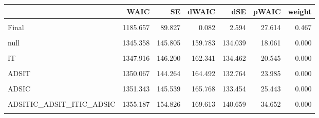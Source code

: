 \documentclass[10pt,dvipsnames,enabledeprecatedfontcommands]{scrartcl}
\begin{document}
\begin{table}
\centering\begingroup\fontsize{9}{11}\selectfont

\begin{tabular}{lrrrrrr}
\toprule
  & WAIC & SE & dWAIC & dSE & pWAIC & weight\\
\midrule
\cellcolor{gray!6}{tooFar} & \cellcolor{gray!6}{1185.575} & \cellcolor{gray!6}{89.393} & \cellcolor{gray!6}{0.000} & \cellcolor{gray!6}{NA} & \cellcolor{gray!6}{27.846} & \cellcolor{gray!6}{0.487}\\
Final & 1185.657 & 89.827 & 0.082 & 2.594 & 27.614 & 0.467\\
\cellcolor{gray!6}{ADSITICCBS\_ITIC\_ADSIC} & \cellcolor{gray!6}{1190.304} & \cellcolor{gray!6}{87.920} & \cellcolor{gray!6}{4.729} & \cellcolor{gray!6}{6.055} & \cellcolor{gray!6}{25.882} & \cellcolor{gray!6}{0.046}\\
null & 1345.358 & 145.805 & 159.783 & 134.039 & 18.061 & 0.000\\
\cellcolor{gray!6}{ADS} & \cellcolor{gray!6}{1347.281} & \cellcolor{gray!6}{142.655} & \cellcolor{gray!6}{161.706} & \cellcolor{gray!6}{131.261} & \cellcolor{gray!6}{21.935} & \cellcolor{gray!6}{0.000}\\
\addlinespace
IT & 1347.916 & 146.200 & 162.341 & 134.462 & 20.545 & 0.000\\
\cellcolor{gray!6}{ADSITIC\_ADSIC} & \cellcolor{gray!6}{1348.366} & \cellcolor{gray!6}{150.638} & \cellcolor{gray!6}{162.791} & \cellcolor{gray!6}{136.811} & \cellcolor{gray!6}{27.604} & \cellcolor{gray!6}{0.000}\\
ADSIT & 1350.067 & 144.264 & 164.492 & 132.764 & 23.985 & 0.000\\
\cellcolor{gray!6}{ADSIT\_ADSIT} & \cellcolor{gray!6}{1351.139} & \cellcolor{gray!6}{154.826} & \cellcolor{gray!6}{165.564} & \cellcolor{gray!6}{141.033} & \cellcolor{gray!6}{31.062} & \cellcolor{gray!6}{0.000}\\
ADSIC & 1351.343 & 145.539 & 165.768 & 133.454 & 25.443 & 0.000\\
\addlinespace
\cellcolor{gray!6}{ADSITIC} & \cellcolor{gray!6}{1353.020} & \cellcolor{gray!6}{147.645} & \cellcolor{gray!6}{167.445} & \cellcolor{gray!6}{135.441} & \cellcolor{gray!6}{26.884} & \cellcolor{gray!6}{0.000}\\
ADSITIC\_ADSIT\_ITIC\_ADSIC & 1355.187 & 154.826 & 169.613 & 140.659 & 34.652 & 0.000\\
\cellcolor{gray!6}{ADSITIC\_ADSIC\_ADSIT} & \cellcolor{gray!6}{1356.479} & \cellcolor{gray!6}{157.522} & \cellcolor{gray!6}{170.905} & \cellcolor{gray!6}{143.538} & \cellcolor{gray!6}{34.533} & \cellcolor{gray!6}{0.000}\\
\bottomrule
\end{tabular}
\endgroup{}
\end{table}
\end{document}
